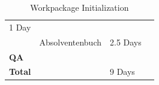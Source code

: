 \documentclass[11pt,a4paper]{article}
\begin{document}
\begin{table}[H]
\begin{tabular}{|l|l|l|l|}
    \multicolumn{1}{|p{1in}|}{1 Day} \\
    \multicolumn{1}{|p{1in}|}{} &
    \multicolumn{1}{|p{3.5in}|}{Absolventenbuch} &
    \multicolumn{1}{|p{1in}|}{2.5 Days} \\
  \hline
    \multicolumn{1}{|p{1in}|}{\bfseries{\textsf{QA}}} &
    \multicolumn{1}{|p{3.5in}|}{} &
    \multicolumn{1}{|p{1in}|}{} \\
  \hline \hline
    \multicolumn{1}{|p{1in}|}{\bfseries{\textsf{Total}}} &
    \multicolumn{1}{|p{3.5in}|}{} &
    \multicolumn{1}{|p{1in}|}{9 Days} \\
  \hline
 \end{tabular}
 \caption{Workpackage Initialization}
 \label{Workpackage Initialization}
\end{table}


%
%
\end{document}
